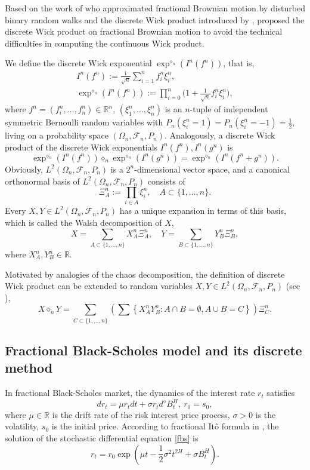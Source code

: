 \documentclass[10pt,a4paper]{amsart}
\numberwithin{equation}{section}
\begin{document}
Based on the work of \cite{sottinen2001fractional} who approximated fractional 
Brownian motion by disturbed binary random walks and the discrete Wick product 
introduced by \cite{holden1992discrete}, \cite{bender2004arbitrage} proposed the 
discrete Wick product on fractional Brownian motion to avoid the technical difficulties 
in computing the continuous Wick product.

We define the discrete Wick exponential 
$\exp ^{\diamond_n}\left(I^n\left(f^n\right)\right)$, that is,
\begin{gather*}
 I^n\left(f^n\right):=\frac{1}{\sqrt{n}} \sum_{i=1}^n f_i^n \xi_i^n, \\
 \exp ^{\diamond_n}\left(I^n\left(f^n\right)\right)
 :=\prod_{i=0}^n\Big(1+\frac{1}{\sqrt{n}} f_i^n \xi_i^n\Big) ,
\end{gather*}
where
$f^n=\left(f_i^n, \dots, f_n^n\right) \in \mathbb{R}^n$,
$\left(\xi_1^n, \dots, \xi_n^n\right)$ is an $n$-tuple of independent symmetric
Bernoulli random variables with 
$P_n\left(\xi_i^n=1\right)=P_n\left(\xi_i^n=-1\right)=\frac{1}{2}$, 
living on a probability space $\left(\Omega_n, \mathcal{F}_n, P_n\right)$.
Analogously, a discrete Wick product of the discrete Wick exponentials 
$I^n\left(f^n\right), I^n\left(g^n\right)$ is
\[
 \exp ^{\diamond_n}\left(I^n\left(f^n\right)\right) \diamond_n 
 \exp ^{\diamond_n}\left(I^n\left(g^n\right)\right)
 =\exp ^{\diamond_n}\left(I^n\left(f^n+g^n\right)\right) .
\]
Obviously, $L^2\left(\Omega_n, \mathcal{F}_n, P_n\right)$ is a $2^n$-dimensional 
vector space, and a canonical orthonormal basis of 
$L^2\left(\Omega_n, \mathcal{F}_n, P_n\right)$ consists of
\[
 \Xi_A^n:=\prod_{i \in A} \xi_i^n, \quad A \subset\{1, \dots, n\}.
\]
Every $X,Y \in L^2\left(\Omega_n, \mathcal{F}_n, P_n\right)$ has a unique expansion 
in terms of this basis, which is called the Walsh decomposition of $X$,
\[
 X=\sum_{A \subset\{1, \dots, n\}} X_A^n \Xi_A^n, \quad
 Y=\sum_{B \subset\{1, \dots, n\}} Y_B^n \Xi_B^n,
\]
where $X_A^n,Y_B^n \in \mathbb{R}$.

Motivated by analogies of the chaos decomposition, the definition of discrete 
Wick product can be extended to random variables 
$X, Y \in L^2\left(\Omega_n, \mathcal{F}_n, P_n\right)$ (see \cite{bender2012connection}),
\[
 X \diamond_n Y=\sum_{C \subset\{1, \dots, n\}}
 \left(\sum\left\{X_A^n Y_B^n: A \cap B=\emptyset, A \cup B=C\right\}\right) \Xi_C^n.
\]

\subsection{Fractional Black-Scholes model and its discrete method}
In fractional Black-Scholes market, the dynamics of the interest rate $r_t$ satisfies
\begin{equation}
\label{fbs}
 d r_t=\mu r_t d t+\sigma r_t d^{\diamond} B_t^H, \ r_0=s_0,
\end{equation}
where $\mu \in \mathbb{R}$ is the drift rate of the risk interest price process, $\sigma>0$ is the volatility, $s_0$ is the initial price. According to fractional It\^o formula in \cite[Theorem 4.3]{duncan2000stochastic}, the solution of the stochastic differential equation \eqref{fbs} is
\[
 r_t=r_0 \exp \left(\mu t-\frac{1}{2} \sigma^2 t^{2 H}+\sigma B_t^H\right).
\]
\end{document}
